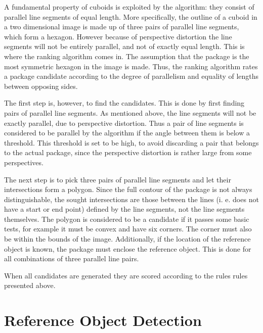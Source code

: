 A fundamental property of cuboids is exploited by the algorithm: they consist of parallel line segments of equal length. 
More specifically, the outline of a cuboid in a two dimensional image is made up of three pairs of parallel line segments, which form a hexagon. 
However because of perspective distortion the line segments will not be entirely parallel, and not  of exactly equal length.
This is where the ranking algorithm comes in.
The assumption that the package is the most symmetric hexagon in the image is made. %
Thus, the ranking algorithm rates a package candidate according to the degree of parallelism and equality of lengths between opposing sides.

The first step is, however, to find the candidates.
This is done by first finding pairs of parallel line segments. 
As mentioned above, the line segments will not be exactly parallel, due to perspective distortion. %
Thus a pair of line segments is considered to be parallel by the algorithm if the angle between them is below a threshold. 
This threshold is set to be high, to avoid discarding a pair that belongs to the actual package, since the perspective distortion is rather large from some perspectives. %

The next step is to pick three pairs of parallel line segments and let their intersections form a polygon. 
Since the full contour of the package is not always distinguishable, the sought intersections are those between the lines (i. e. does not have a start or end point) defined by the line segments, not the line segments themselves. %
The polygon is considered to be a candidate if it passes some basic tests, for example it must be convex and have six corners. 
The corner must also be within the bounds of the image.
Additionally, if the location of the reference object is known, the package must enclose the reference object.
This is done for all combinations of three parallel line pairs.

When all candidates are generated they are scored according to the rules rules presented above.

\section{Reference Object Detection}

